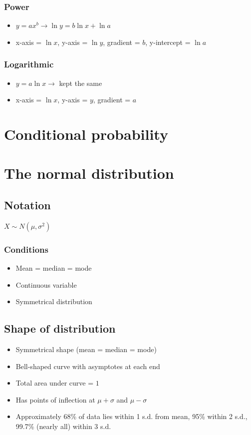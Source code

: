 \documentclass[fleqn, 11pt]{article}
\begin{document}
	\subsubsection{Power}
	\begin{itemize}
		\item $y=ax^b\rightarrow\ln y = b\ln x + \ln a$
		\item x-axis = $\ln x$, y-axis = $\ln y$, gradient = $b$, y-intercept = $\ln a$
	\end{itemize}
	
	\subsubsection{Logarithmic}
	\begin{itemize}
		\item $y=a\ln x\rightarrow$ kept the same
		\item x-axis = $\ln x$, y-axis = $y$, gradient = $a$
	\end{itemize}
	
	\pagebreak
	
	\section{Conditional probability}
	
	\pagebreak
	
	\section{The normal distribution}
	
	\subsection{Notation}
	$X \sim N(\mu,\sigma^2)$
	\subsubsection{Conditions}
	\begin{itemize}
		\item Mean = median = mode
		\item Continuous variable
		\item Symmetrical distribution
	\end{itemize}
	\subsection{Shape of distribution}
	\begin{itemize}
		\item Symmetrical shape (mean = median = mode)
		\item Bell-shaped curve with asymptotes at each end
		\item Total area under curve = $1$
		\item Has points of inflection at $\mu+\sigma$ and $\mu-\sigma$
		\item Approximately 68\% of data lies within 1 s.d. from mean, 95\% within 2 s.d., 99.7\% (nearly all) within 3 s.d.
	\end{itemize}
	
\end{document}
